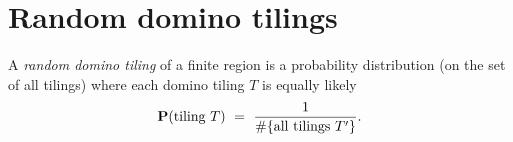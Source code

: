 \documentclass[11pt,fleqn]{book} %
\begin{document}












    

\newpage
    \chapter{Random domino tilings}


\setcounter{problem}{0}


\begin{definition}
    A \emph{random domino tiling} of a finite region is a probability distribution (on the set of all tilings) where each domino tiling $T$ is equally likely
    $$\mathbf{P}(\textup{tiling }T) \ = \ \frac{1}{\#\{\textup{all tilings }T'\}}.$$
\end{definition}
\end{document}
